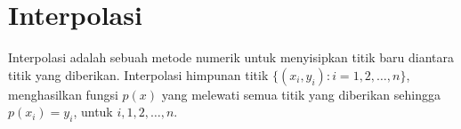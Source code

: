 
\section{Interpolasi}
Interpolasi adalah sebuah metode numerik untuk menyisipkan titik baru diantara titik yang diberikan. Interpolasi himpunan titik $\{(x_i,y_i): i=1,2,\dots,n\}$, menghasilkan fungsi $p(x)$ yang melewati semua titik yang diberikan sehingga $p(x_i)=y_i$, untuk $i,1,2,\dots,n$.

